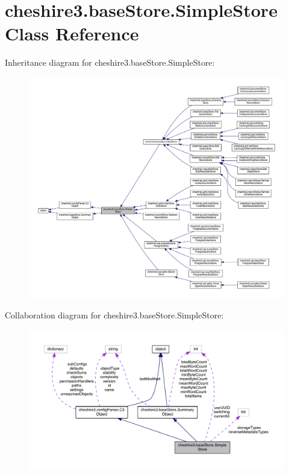 \hypertarget{classcheshire3_1_1base_store_1_1_simple_store}{\section{cheshire3.\-base\-Store.\-Simple\-Store Class Reference}
\label{classcheshire3_1_1base_store_1_1_simple_store}
}


Inheritance diagram for cheshire3.\-base\-Store.\-Simple\-Store\-:
\nopagebreak
\begin{figure}[H]
\begin{center}
\leavevmode
\includegraphics[width=350pt]{classcheshire3_1_1base_store_1_1_simple_store__inherit__graph}
\end{center}
\end{figure}


Collaboration diagram for cheshire3.\-base\-Store.\-Simple\-Store\-:
\nopagebreak
\begin{figure}[H]
\begin{center}
\leavevmode
\includegraphics[width=350pt]{classcheshire3_1_1base_store_1_1_simple_store__coll__graph}
\end{center}
\end{figure}
